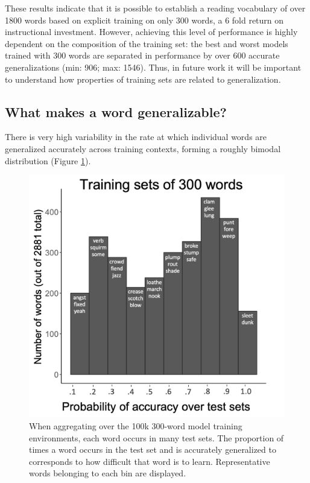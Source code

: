 \documentclass[10pt,letterpaper]{article}
\begin{document}
These results indicate that it is possible to establish a reading vocabulary of over 1800 words based on explicit training on only 300 words, a 6 fold return on instructional investment. However, achieving this level of performance is highly dependent on the composition of the training set: the best and worst models trained with 300 words are separated in performance by over 600 accurate generalizations (min: 906; max: 1546). Thus, in future work it will be important to understand how properties of training sets are related to generalization.   

\subsection{What makes a word generalizable?}
There is very high variability in the rate at which individual words are generalized accurately across training contexts, forming a roughly bimodal distribution (Figure \ref{word_acc_hist}).

\begin{figure}[t]
	\includegraphics[width=0.9\columnwidth]{figures/word_accuracy_over_testsets.png}

	\caption{When aggregating over the 100k 300-word model training environments, each word occurs in many test sets. The proportion of times a word occurs in the test set and is accurately generalized to corresponds to how difficult that word is to learn. Representative words belonging to each bin are displayed.}
	\label{word_acc_hist}
\end{figure}
\end{document}

